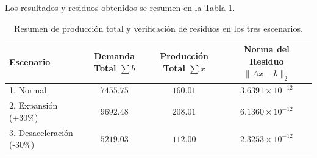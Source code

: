 \documentclass[11pt,a4paper]{article}
\theoremstyle{definition}
\theoremstyle{remark}
\begin{document}
Los resultados y residuos obtenidos se resumen en la Tabla \ref{tab:residuos_plu}.
\begin{table}[h!]
    \centering
    \small
    \caption{Resumen de producción total y verificación de residuos en los tres escenarios.}
    \label{tab:residuos_plu}
    \begin{tabular}{lccc}
        \toprule
        \textbf{Escenario} & \textbf{Demanda Total $\sum b$} & \textbf{Producción Total $\sum x$} & \textbf{Norma del Residuo $\|Ax - b\|_2$} \\
        \midrule
        1. Normal & $7455.75$ & $160.01$ & $3.6391 \times 10^{-12}$ \\
        2. Expansión (+30\%) & $9692.48$ & $208.01$ & $6.1360 \times 10^{-12}$ \\
        3. Desaceleración (-30\%) & $5219.03$ & $112.00$ & $2.3253 \times 10^{-12}$ \\
        \bottomrule
    \end{tabular}
\end{table}
\end{document}
